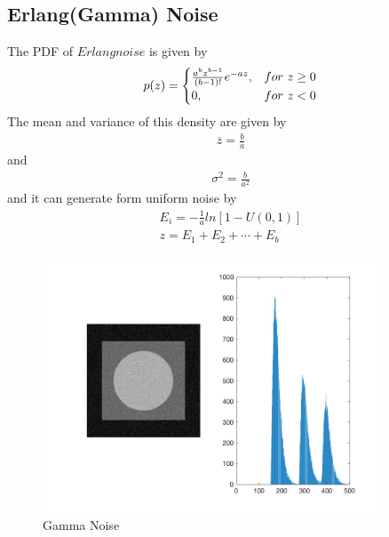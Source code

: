 \documentclass[11pt,oneside]{book}
\begin{document}
\subsection{Erlang(Gamma) Noise}
The PDF of $Erlang noise$ is given by\\
\begin{eqnarray}p(z)=
\begin{cases}
\frac{a^bz^{b-1}}{(b-1)!}e^{-az}, &for\ z \ge 0\cr 0, &for\ z <0\end{cases}
\end{eqnarray}
The mean and variance of this density are given by\\
\begin{align}
\overline z = \frac{b}{a}
\end{align}
and\\
\begin{align}
 \sigma ^2 = \frac{b}{a^2}
\end{align}
and it can generate form uniform noise by\\
\begin{align}
  E_i = -\frac{1}{a}ln[1-U(0,1)]\\
  z=E_1+E_2+\cdots+E_b
\end{align}
\begin{figure}[!htb]
   \centering  
   \includegraphics[width=0.9\textwidth]{images/4/gamma.jpg}
   \caption{Gamma Noise}  
\end{figure}
\newpage
\end{document}
